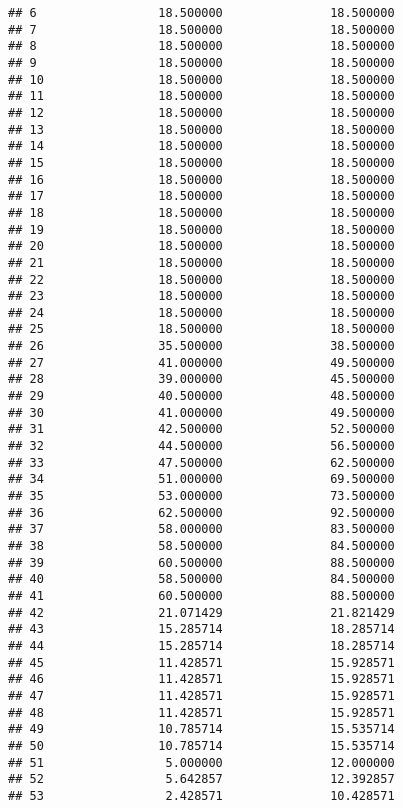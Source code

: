 \documentclass[]{article}
\begin{document}
\begin{verbatim}
## 6                 18.500000               18.500000
## 7                 18.500000               18.500000
## 8                 18.500000               18.500000
## 9                 18.500000               18.500000
## 10                18.500000               18.500000
## 11                18.500000               18.500000
## 12                18.500000               18.500000
## 13                18.500000               18.500000
## 14                18.500000               18.500000
## 15                18.500000               18.500000
## 16                18.500000               18.500000
## 17                18.500000               18.500000
## 18                18.500000               18.500000
## 19                18.500000               18.500000
## 20                18.500000               18.500000
## 21                18.500000               18.500000
## 22                18.500000               18.500000
## 23                18.500000               18.500000
## 24                18.500000               18.500000
## 25                18.500000               18.500000
## 26                35.500000               38.500000
## 27                41.000000               49.500000
## 28                39.000000               45.500000
## 29                40.500000               48.500000
## 30                41.000000               49.500000
## 31                42.500000               52.500000
## 32                44.500000               56.500000
## 33                47.500000               62.500000
## 34                51.000000               69.500000
## 35                53.000000               73.500000
## 36                62.500000               92.500000
## 37                58.000000               83.500000
## 38                58.500000               84.500000
## 39                60.500000               88.500000
## 40                58.500000               84.500000
## 41                60.500000               88.500000
## 42                21.071429               21.821429
## 43                15.285714               18.285714
## 44                15.285714               18.285714
## 45                11.428571               15.928571
## 46                11.428571               15.928571
## 47                11.428571               15.928571
## 48                11.428571               15.928571
## 49                10.785714               15.535714
## 50                10.785714               15.535714
## 51                 5.000000               12.000000
## 52                 5.642857               12.392857
## 53                 2.428571               10.428571

\end{verbatim}
\end{document}
